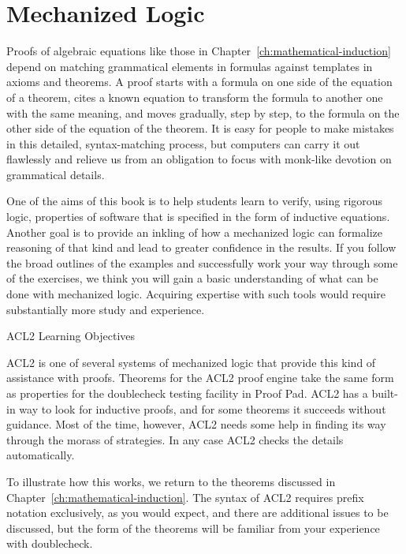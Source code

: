 \chapter{Mechanized Logic}
\label{ch:mechanized-logic}

Proofs of algebraic equations
like those in Chapter~\ref{ch:mathematical-induction}
depend on matching grammatical elements in formulas
against templates in axioms and theorems.
A proof starts with a formula on one side
of the equation of a theorem,
cites a known equation to transform the formula
to another one with the same meaning,
and moves gradually, step by step, to the formula
on the other side of the equation of the theorem.
It is easy for people to make mistakes in this detailed, syntax-matching process,
but computers can carry it out flawlessly and
relieve us from an obligation to focus with monk-like devotion on grammatical details.

\begin{aside}
One of the aims of this book is to help students learn to
verify, using rigorous logic, properties of software
that is specified in the form of inductive equations.
Another goal is to provide
an inkling of how a mechanized logic
can formalize reasoning of that kind
and lead to greater confidence in the results.
If you follow the broad outlines of the examples
and successfully work your way through some of the exercises,
we think you will gain a basic understanding
of what can be done with mechanized logic.
Acquiring expertise with such tools
would require substantially more study and experience.
\caption{ACL2 Learning Objectives}
\label{aside:acl2-learning-objectives}
\end{aside}

ACL2 is one of several systems of mechanized logic that provide this
kind of assistance with proofs.
Theorems for the ACL2 proof engine take the same form
as properties for the doublecheck testing facility in Proof Pad.
ACL2 has a built-in way to look for inductive proofs,
and for some theorems it succeeds without guidance.
Most of the time, however, ACL2 needs some help in
finding its way through the morass of strategies.
In any case ACL2 checks the details automatically.

To illustrate how this works, we return to the theorems
discussed in Chapter~\ref{ch:mathematical-induction}.
The syntax of ACL2 requires prefix notation exclusively,
as you would expect, and there are additional issues
to be discussed, but the form of the theorems
will be familiar from your experience with doublecheck.

